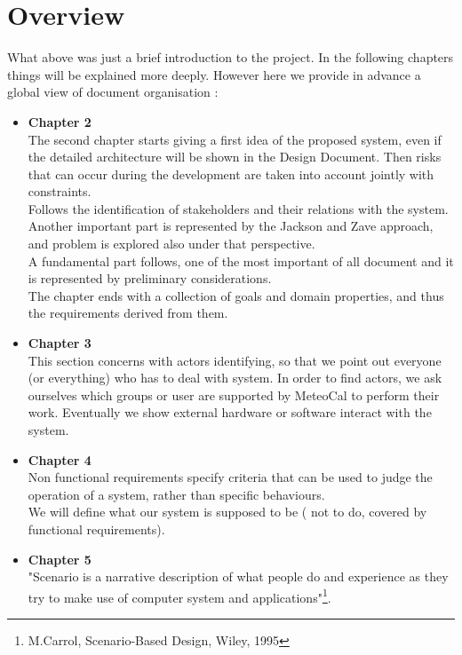 \documentclass[12pt]{book}
\begin{document}
\section{Overview}
What above was just a brief introduction to the project. In the following chapters things will be explained more deeply. 
However here we provide in advance a global view of document organisation : 
\begin{itemize}
	\item{\textbf{Chapter 2} \\ The second chapter starts giving a first idea of the proposed system, even if the detailed architecture will be shown in the Design Document. Then risks that can occur during the development are taken into account jointly with constraints. \\ Follows the identification of stakeholders and their relations with the system. \\ Another important part is represented by the Jackson and Zave approach, and problem is explored also under that perspective. \\ A fundamental part follows, one of the most important of all document and it is represented by preliminary considerations. \\
	The chapter ends with a collection of goals and domain properties, and thus the requirements derived from them.}
	\item{\textbf{Chapter 3}}\\ This section concerns with actors identifying, so that we point out everyone (or everything) who has to deal with system. In order to find actors, we ask ourselves which groups or user are supported by MeteoCal to perform their work. Eventually we show external hardware or software interact with the system. \\
	\item{\textbf{Chapter 4}}\\
	Non functional requirements specify criteria that can be used to judge the operation of a system, rather than specific behaviours. \\ We will define what our system is supposed to be ( not to do, covered by functional requirements). \\ 
	\item{\textbf{Chapter 5}}\\
	"Scenario is a narrative description of what people do and experience as they try to make use of computer system and applications"\footnote{M.Carrol, Scenario-Based Design, Wiley, 1995}.\\

\end{itemize}
\end{document}
